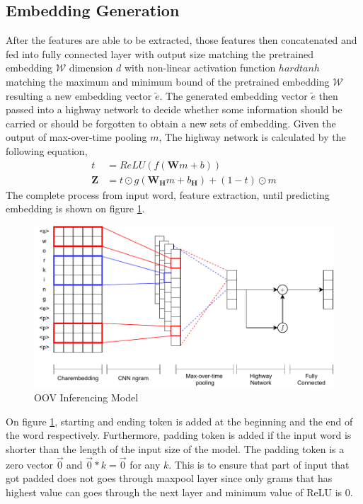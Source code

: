     \subsection{Embedding Generation}
        After the features are able to be extracted, those features
        then concatenated and fed into fully connected layer with
        output size matching the pretrained embedding $\mathcal{W}$
        dimension $d$ with non-linear activation function $hardtanh$
        matching the maximum and minimum bound of the pretrained
        embedding $\mathcal{W}$ resulting a new embedding vector
        $\tilde{e}$. The generated embedding vector $\tilde{e}$ then
        passed into a highway network to decide whether some
        information should be carried or should be forgotten to obtain
        a new sets of embedding. Given the output of max-over-time
        pooling $m$, The highway network is calculated by the
        following equation, 
        \begin{align}
            \label{eq:highway}
            t &= ReLU(f(\mathbf{W}m + b))\\
            \mathbf{Z} &= t \odot g(\mathbf{W_{\mathbf{H}}}m + b_{\mathbf{H}}) + (1-t) \odot m
        \end{align}
        The complete process from input word, feature extraction,
        until predicting embedding is shown on figure \ref{fig:model}.
        
        \begin{figure}
            \centering
            \includegraphics[width=.8\linewidth]{images/model2.pdf}
            \caption{OOV Inferencing Model}
            \label{fig:model}
        \end{figure}

        On figure \ref{fig:model}, starting and ending token is added
        at the beginning and the end of the word respectively.
        Furthermore, padding token is added if the input word is
        shorter than the length of the input size of the model. The
        padding token is a zero vector $\vec{0}$ and $\vec{0} * k =
        \vec{0}$ for any $k$. This is to ensure that part of input
        that got padded does not goes through maxpool layer since only
        grams that has highest value can goes through the next layer
        and minimum value of ReLU is 0.

